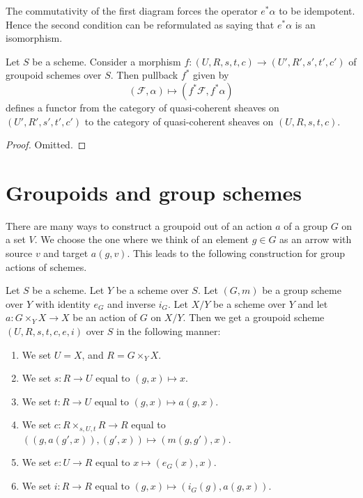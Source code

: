 \noindent
The commutativity of the first diagram forces the operator $e^*\alpha$
to be idempotent. Hence the second condition can be reformulated as saying
that $e^*\alpha$ is an isomorphism.

\begin{lemma}
\label{lemma-pullback}
Let $S$ be a scheme. Consider a morphism
$f : (U, R, s, t, c) \to (U', R', s', t', c')$
of groupoid schemes over $S$. Then pullback $f^*$ given by
$$
(\mathcal{F}, \alpha) \mapsto (f^*\mathcal{F}, f^*\alpha)
$$
defines a functor from the category of quasi-coherent sheaves on
$(U', R', s', t', c')$ to the category of quasi-coherent sheaves on
$(U, R, s, t, c)$.
\end{lemma}

\begin{proof}
Omitted.
\end{proof}






\section{Groupoids and group schemes}
\label{section-groupoids-group-schemes}

\noindent
There are many ways to construct a groupoid out of an action $a$
of a group $G$ on a set $V$. We choose the one where we think
of an element $g \in G$ as an arrow with source $v$ and target $a(g, v)$.
This leads to the following construction for group actions of
schemes.

\begin{lemma}
\label{lemma-groupoid-from-action}
Let $S$ be a scheme.
Let $Y$ be a scheme over $S$.
Let $(G, m)$ be a group scheme over $Y$ with
identity $e_G$ and inverse $i_G$.
Let $X/Y$ be a scheme over $Y$ and let $a : G \times_Y X \to X$
be an action of $G$ on $X/Y$.
Then we get a groupoid scheme $(U, R, s, t, c, e, i)$ over $S$
in the following manner:
\begin{enumerate}
\item We set $U = X$, and $R = G \times_Y X$.
\item We set $s : R \to U$ equal to $(g, x) \mapsto x$.
\item We set $t : R \to U$ equal to $(g, x) \mapsto a(g, x)$.
\item We set $c : R \times_{s, U, t} R \to R$ equal to
$((g, a(g', x)), (g', x)) \mapsto (m(g, g'), x)$.
\item We set $e : U \to R$ equal to $x \mapsto (e_G(x), x)$.
\item We set $i : R \to R$ equal to $(g, x) \mapsto (i_G(g), a(g, x))$.
\end{enumerate}
\end{lemma}

